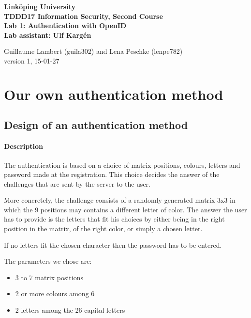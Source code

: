 \documentclass[11pt,a4paper]{article}
\begin{document}
	
\begin{center}
{\bfseries
Linköping University\\
TDDD17 Information Security, Second Course\\

Lab 1: Authentication with OpenID\\
Lab assistant: Ulf Kargén\\[10pt]}

Guillaume Lambert (guila302) and Lena Peschke (lenpe782)\\
version 1, 15-01-27
\end{center}

\hrulefill


\section*{Our own authentication method}
\subsection*{Design of an authentication method}
\paragraph{Description}

The authentication is based on a choice of matrix positions, colours, letters and password made at the registration.
This choice decides the answer of the challenges that are sent by the server to the user.

More concretely, the challenge consists of a randomly generated matrix 3x3 in which the 9 positions may contains a
different letter of color. The answer the user has to provide is the letters that fit his choices by either being in the
right position in the matrix, of the right color, or simply a chosen letter.

If no letters fit the chosen character then the password has to be entered.

The parameters we chose are:
\begin{itemize}
\item 3 to 7 matrix positions
\item 2 or more colours among 6
\item 2 letters among the 26 capital letters
\end{itemize}
\end{document}
